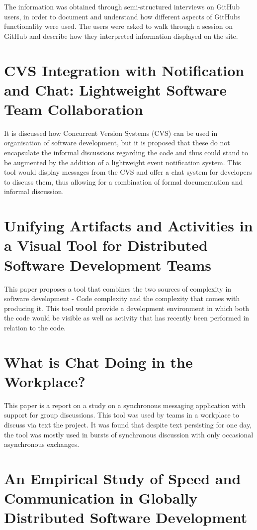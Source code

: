 \documentclass{l4proj}
\begin{document}
The information was obtained through semi-structured interviews on GitHub users, in order to document and understand how different aspects of GitHubs functionality were used.  The users were asked to walk through a session on GitHub and describe how they interpreted information displayed on the site.

\section {CVS Integration with Notification and Chat: Lightweight Software Team Collaboration}

It is discussed how Concurrent Version Systems (CVS) can be used in organisation of software development, but it is proposed that these do not encapsulate the informal discussions regarding the code and thus could stand to be augmented by the addition of a lightweight event notification system.  This tool would display messages from the CVS and offer a chat system for developers to discuss them, thus allowing for a combination of formal documentation and informal discussion.

\section {Unifying Artifacts and Activities in a Visual Tool for Distributed Software Development Teams}

This paper proposes a tool that combines the two sources of complexity in software development - Code complexity and the complexity that comes with producing it.  This tool would provide a development environment in which both the code would be visible as well as activity that has recently been performed in relation to the code.

\section {What is Chat Doing in the Workplace?}

This paper is a report on a study on a synchronous messaging application with support for group discussions.  This tool was used by teams in a workplace to discuss via text the project. It was found that despite text persisting for one day, the tool was mostly used in bursts of synchronous discussion with only occasional asynchronous exchanges. 


\section {An Empirical Study of Speed and Communication in Globally Distributed Software Development}
\end{document}
